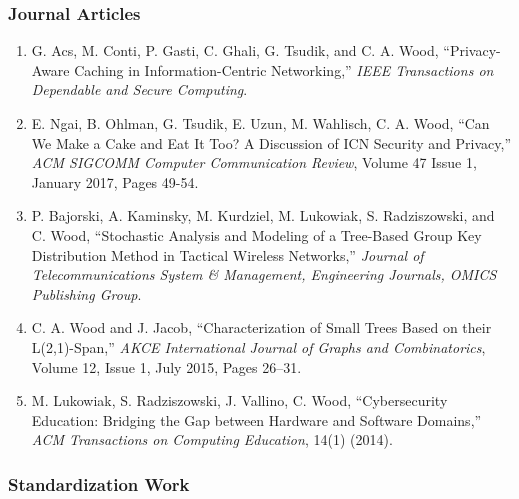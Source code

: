\documentclass[10pt]{res} %
\begin{document}
\begin{resume}
\vspace{-15pt}
\subsubsection*{Journal Articles}

\begin{enumerate}[J-1.]

\item G. Acs, M. Conti, P. Gasti, C. Ghali, G. Tsudik, and C. A. Wood, ``Privacy-Aware Caching in Information-Centric Networking,'' \emph{IEEE Transactions on Dependable and Secure Computing}.

\item E. Ngai, B. Ohlman, G. Tsudik, E. Uzun, M. Wahlisch, C. A. Wood, ``Can We Make a Cake and Eat It Too? A Discussion of ICN Security and Privacy,'' \emph{ACM SIGCOMM Computer Communication Review}, Volume 47 Issue 1, January 2017, Pages 49-54.

\item P. Bajorski, A. Kaminsky, M. Kurdziel, M. Lukowiak, S. Radziszowski, and C. Wood, ``Stochastic Analysis and Modeling of a Tree-Based Group Key Distribution Method in Tactical Wireless Networks,'' \emph{Journal of Telecommunications System \& Management, Engineering Journals, OMICS Publishing Group}.

\item C. A. Wood and J. Jacob, ``Characterization of Small Trees Based on their L(2,1)-Span,'' \emph{AKCE International Journal of Graphs and Combinatorics}, Volume 12, Issue 1, July 2015, Pages 26–31.

\item M. Lukowiak, S. Radziszowski, J. Vallino, C. Wood, ``Cybersecurity Education: Bridging the Gap between Hardware and Software Domains,'' \emph{ACM Transactions on Computing Education}, 14(1) (2014).

\end{enumerate}


\vspace{-15pt}
\subsubsection*{Standardization Work}
\begin{enumerate}[D-1.]


\end{enumerate}
\end{resume}
\end{document}
